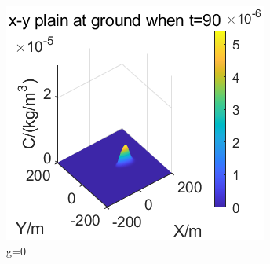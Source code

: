 \documentclass{article}
\begin{document}
\begin{figure}[htbp]
		\begin{minipage}{0.33\textwidth}
			\includegraphics[width=\textwidth]{pics/g=0,t=90.png}
		\end{minipage}
		\caption{g=0}
		\label{fig23}
	\end{figure}
	
\end{document}
